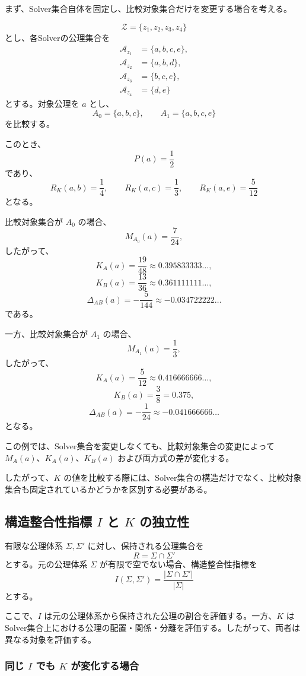\documentclass[a4paper,11pt]{ltjsarticle}
\begin{document}
まず、Solver集合自体を固定し、比較対象集合だけを変更する場合を考える。

\[
\mathcal{Z}=\{z_1,z_2,z_3,z_4\}
\]
とし、各Solverの公理集合を
\[
\begin{aligned}
\mathcal{A}_{z_1}&=\{a,b,c,e\},\\
\mathcal{A}_{z_2}&=\{a,b,d\},\\
\mathcal{A}_{z_3}&=\{b,c,e\},\\
\mathcal{A}_{z_4}&=\{d,e\}
\end{aligned}
\]
とする。対象公理を $a$ とし、
\[
A_0=\{a,b,c\},\qquad
A_1=\{a,b,c,e\}
\]
を比較する。

このとき、
\[
P(a)=\frac12
\]
であり、
\[
R_K(a,b)=\frac14,\qquad
R_K(a,c)=\frac13,\qquad
R_K(a,e)=\frac5{12}
\]
となる。

比較対象集合が $A_0$ の場合、
\[
M_{A_0}(a)=\frac{7}{24},
\]
したがって、
\[
K_A(a)=\frac{19}{48}
\approx 0.395833333\ldots,
\]
\[
K_B(a)=\frac{13}{36}
\approx 0.361111111\ldots,
\]
\[
\Delta_{AB}(a)=-\frac5{144}
\approx -0.034722222\ldots
\]
である。

一方、比較対象集合が $A_1$ の場合、
\[
M_{A_1}(a)=\frac13,
\]
したがって、
\[
K_A(a)=\frac5{12}
\approx 0.416666666\ldots,
\]
\[
K_B(a)=\frac38=0.375,
\]
\[
\Delta_{AB}(a)=-\frac1{24}
\approx -0.041666666\ldots
\]
となる。

この例では、Solver集合を変更しなくても、比較対象集合の変更によって $M_A(a)$、$K_A(a)$、$K_B(a)$ および両方式の差が変化する。

したがって、$K$ の値を比較する際には、Solver集合の構造だけでなく、比較対象集合も固定されているかどうかを区別する必要がある。

\subsection{構造整合性指標 $I$ と $K$ の独立性}

有限な公理体系 $\Sigma,\Sigma'$ に対し、保持される公理集合を
\[
R=\Sigma\cap\Sigma'
\]
とする。元の公理体系 $\Sigma$ が有限で空でない場合、構造整合性指標を
\[
I(\Sigma,\Sigma')
=\frac{|\Sigma\cap\Sigma'|}{|\Sigma|}
\tag{8}
\]
とする。

ここで、$I$ は元の公理体系から保持された公理の割合を評価する。一方、$K$ はSolver集合上における公理の配置・関係・分離を評価する。したがって、両者は異なる対象を評価する。

\subsubsection{同じ $I$ でも $K$ が変化する場合}
\end{document}
